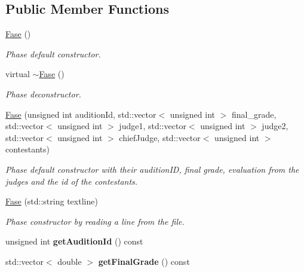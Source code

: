 \subsection*{Public Member Functions}
\begin{DoxyCompactItemize}
\item 
\mbox{\label{class_fase_a7028d5e9bc110b73a584b29c2006246c}} 
\hyperlink{class_fase_a7028d5e9bc110b73a584b29c2006246c}{Fase} ()
\begin{DoxyCompactList}\small\item\em Phase default constructor. \end{DoxyCompactList}\item 
\mbox{\label{class_fase_aeccaf20fceca679c5a88b1a6fc40b26f}} 
virtual \hyperlink{class_fase_aeccaf20fceca679c5a88b1a6fc40b26f}{$\sim$\+Fase} ()
\begin{DoxyCompactList}\small\item\em Phase deconstructor. \end{DoxyCompactList}\item 
\hyperlink{class_fase_a2c24bb5d2c4c0f3935c9843600b1b2ba}{Fase} (unsigned int audition\+Id, std\+::vector$<$ unsigned int $>$ final\+\_\+grade, std\+::vector$<$ unsigned int $>$ judge1, std\+::vector$<$ unsigned int $>$ judge2, std\+::vector$<$ unsigned int $>$ chief\+Judge, std\+::vector$<$ unsigned int $>$ contestants)
\begin{DoxyCompactList}\small\item\em Phase default constructor with their audition\+ID, final grade, evaluation from the judges and the id of the contestants. \end{DoxyCompactList}\item 
\hyperlink{class_fase_a645ce6349297a150d75f17e5ac44c498}{Fase} (std\+::string textline)
\begin{DoxyCompactList}\small\item\em Phase constructor by reading a line from the file. \end{DoxyCompactList}\item 
\mbox{\label{class_fase_aec5a708ac331f4abb116c77ffb4ba7a0}} 
unsigned int {\bfseries get\+Audition\+Id} () const
\item 
\mbox{\label{class_fase_a9b80df1ce2860ec40f63830b6c6b6ced}} 
std\+::vector$<$ double $>$ {\bfseries get\+Final\+Grade} () const

\end{DoxyCompactItemize}

